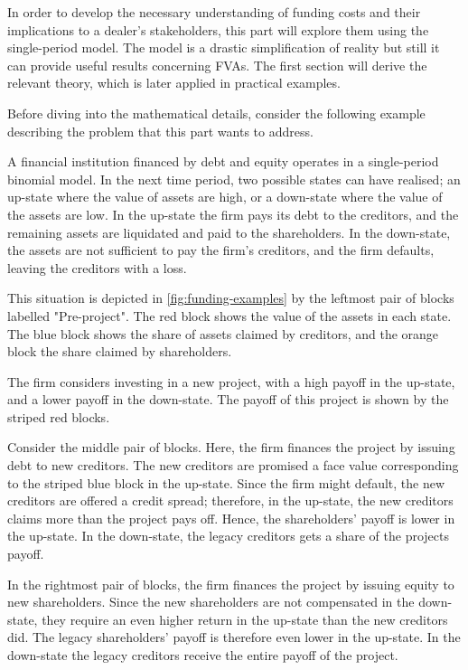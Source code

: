 \documentclass[main.tex]{subfiles}
\begin{document}
    In order to develop the necessary understanding of funding costs 
    and their implications to a dealer's stakeholders, 
    this part will explore them using the single-period model.
    The model is a drastic simplification of reality 
    but still it can provide useful results concerning FVAs.
    The first section will derive the relevant theory, 
    which is later applied in practical examples.

    Before diving into the mathematical details, consider the following example
    describing the problem that this part wants to address.

    \begin{example}
    
    A financial institution financed by debt and equity operates in a single-period binomial model.
    In the next time period, two possible states can have realised;
    an up-state where the value of assets are high,
    or a down-state where the value of the assets are low.
    In the up-state the firm pays its debt to the creditors,
    and the remaining assets are liquidated and paid to the shareholders.
    In the down-state, the assets are not sufficient to pay the firm's creditors, 
    and the firm defaults, leaving the creditors with a loss. 

    This situation is depicted in \cref{fig:funding-examples} 
    by the leftmost pair of blocks labelled "Pre-project". 
    The \textcolor{wtf-red}{red block} shows the value of the assets in each state.
    The \textcolor{wtf-blue}{blue block} shows the share of assets claimed by creditors,
    and the \textcolor{wtf-orange}{orange block} the share claimed by shareholders.

    The firm considers investing in a new project, with a high payoff in the up-state,
    and a lower payoff in the down-state.
    The payoff of this project is shown by the striped red blocks.

    Consider the middle pair of blocks.
    Here, the firm finances the project by issuing debt to new creditors.
    The new creditors are promised a face value 
    corresponding to the striped blue block in the up-state.
    Since the firm might default, the new creditors are offered a credit spread;
    therefore, in the up-state, the new creditors claims more than the project pays off.
    Hence, the shareholders' payoff is lower in the up-state. 
    In the down-state, the legacy creditors gets a share of the projects payoff.

    In the rightmost pair of blocks,
    the firm finances the project by issuing equity to new shareholders.
    Since the new shareholders are not compensated in the down-state,
    they require an even higher return in the up-state than the new creditors did.
    The legacy shareholders' payoff is therefore even lower in the up-state.
    In the down-state the legacy creditors receive the entire payoff of the project.

    \end{example}
\end{document}
